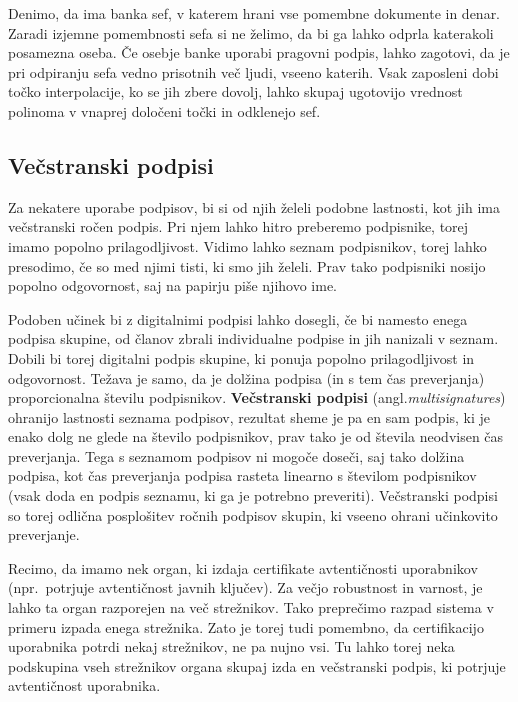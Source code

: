\documentclass[isrm2, tisk]{fmfdelo}
\begin{document}
\begin{primer}
    Denimo, da ima banka sef, v katerem hrani vse pomembne dokumente in denar. Zaradi
    izjemne pomembnosti sefa si ne želimo, da bi ga lahko odprla katerakoli posamezna oseba. Če 
    osebje banke uporabi pragovni podpis, lahko zagotovi, da je pri odpiranju sefa vedno prisotnih
    več ljudi, vseeno katerih. Vsak zaposleni dobi točko interpolacije, ko se jih zbere dovolj,
    lahko skupaj ugotovijo vrednost polinoma v vnaprej določeni točki in odklenejo sef.
\end{primer}

\subsection{Večstranski podpisi}
\label{sec:multisig}
Za nekatere uporabe podpisov, bi si od njih želeli podobne lastnosti, kot jih ima večstranski ročen podpis. 
Pri njem lahko hitro preberemo podpisnike, torej imamo popolno prilagodljivost. Vidimo lahko seznam 
podpisnikov, torej lahko presodimo, če so med njimi tisti, ki smo jih želeli. Prav tako podpisniki nosijo 
popolno odgovornost, saj na papirju piše njihovo ime. 

Podoben učinek bi z digitalnimi podpisi lahko dosegli, če bi namesto enega podpisa skupine, od članov 
zbrali individualne podpise in jih nanizali v seznam. Dobili bi torej digitalni podpis skupine, ki 
ponuja popolno prilagodljivost in odgovornost. Težava je samo, da je dolžina podpisa (in s tem čas 
preverjanja) proporcionalna številu podpisnikov. \textbf{Večstranski podpisi} (angl.\textit{multisignatures})
ohranijo lastnosti seznama podpisov, rezultat sheme je pa en sam podpis, ki je enako dolg ne glede 
na število podpisnikov, prav tako je od števila neodvisen čas preverjanja. Tega s seznamom podpisov 
ni mogoče doseči, saj tako dolžina podpisa, kot čas preverjanja podpisa rasteta linearno s številom 
podpisnikov (vsak doda en podpis seznamu, ki ga je potrebno preveriti). Večstranski podpisi so torej 
odlična posplošitev ročnih podpisov skupin, ki vseeno ohrani učinkovito preverjanje.

\begin{primer}
    Recimo, da imamo nek organ, ki izdaja certifikate avtentičnosti uporabnikov (npr.\ potrjuje 
    avtentičnost javnih ključev). Za večjo robustnost in varnost, je lahko ta organ razporejen 
    na več strežnikov. Tako preprečimo razpad sistema v primeru izpada enega strežnika. Zato je 
    torej tudi pomembno, da certifikacijo uporabnika potrdi nekaj strežnikov, ne pa nujno vsi. 
    Tu lahko torej neka podskupina vseh strežnikov organa skupaj izda en večstranski podpis, ki 
    potrjuje avtentičnost uporabnika.
\end{primer}
\end{document}
